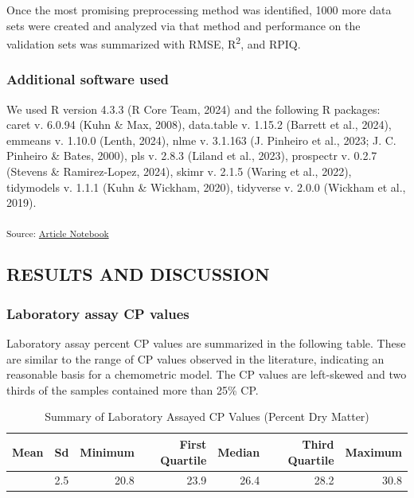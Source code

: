 \documentclass[
]{agujournal2019}
\begin{document}
Once the most promising preprocessing method was identified, 1000 more
data sets were created and analyzed via that method and performance on
the validation sets was summarized with RMSE, R\textsuperscript{2}, and
RPIQ.

\subsubsection{Additional software used}\label{additional-software-used}

We used R version 4.3.3 (R Core Team, 2024) and the following R
packages: caret v. 6.0.94 (Kuhn \& Max, 2008), data.table v. 1.15.2
(Barrett et al., 2024), emmeans v. 1.10.0 (Lenth, 2024), nlme v. 3.1.163
(J. Pinheiro et al., 2023; J. C. Pinheiro \& Bates, 2000), pls v. 2.8.3
(Liland et al., 2023), prospectr v. 0.2.7 (Stevens \& Ramirez-Lopez,
2024), skimr v. 2.1.5 (Waring et al., 2022), tidymodels v. 1.1.1 (Kuhn
\& Wickham, 2020), tidyverse v. 2.0.0 (Wickham et al., 2019).

\textsubscript{Source:
\href{https://rvcrawford.github.io/glowing-system/index-preview.html}{Article
Notebook}}

\subsection{RESULTS AND DISCUSSION}\label{results-and-discussion}

\subsubsection{Laboratory assay CP
values}\label{laboratory-assay-cp-values}

Laboratory assay percent CP values are summarized in the following
table. These are similar to the range of CP values observed in the
literature, indicating an reasonable basis for a chemometric model. The
CP values are left-skewed and two thirds of the samples contained more
than 25\% CP.

\begin{longtable}[]{@{}rrrrrrr@{}}

\caption{\label{tbl-lab-protein-vals}Summary of Laboratory Assayed CP
Values (Percent Dry Matter)}

\tabularnewline

\toprule\noalign{}
Mean & Sd & Minimum & First Quartile & Median & Third Quartile &
Maximum \\
\midrule\noalign{}
\endhead
\bottomrule\noalign{}
\endlastfoot
26.1 & 2.5 & 20.8 & 23.9 & 26.4 & 28.2 & 30.8 \\

\end{longtable}
\end{document}
